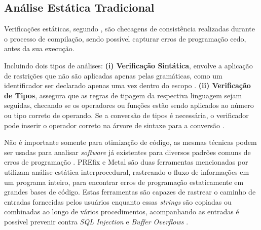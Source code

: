 \documentclass[
    12pt,                %
    openright,           %
    oneside,             %
    a4paper,             %
    english,             %
    brazil               %
]{abntex2}
\begin{document}
\begin{itemize}
\subsection{Análise Estática Tradicional}
\label{sec:analisetradicional}
\par
Verificações estáticas, segundo , são checagens de consistência realizadas durante o processo de compilação, sendo possível capturar erros de programação cedo, antes da sua execução. 
\par
Incluindo dois tipos de análises: 
\textbf{(i) Verificação Sintática}, envolve a aplicação de restrições que não são aplicadas apenas pelas gramáticas, como um identificador ser declarado apenas uma vez dentro do escopo \cite{aho2007compilers}.
\textbf{(ii) Verificação de Tipos}, assegura que as regras de tipagem da respectiva linguagem sejam seguidas, checando se os operadores ou funções estão sendo aplicados ao número ou tipo correto de operando.
Se a conversão de tipos é necessária, o verificador pode inserir o operador correto na árvore de sintaxe para a conversão \cite{aho2007compilers}.
\par
Não é importante somente para otimização de código, as mesmas técnicas podem ser usadas para analisar \textit{software} já existentes para diversos padrões comuns de erros de programação \cite{aho2007compilers}.
PREfix e Metal são duas ferramentas mencionadas por  utilizam análise estática interprocedural, rastreando o fluxo de informações em um programa inteiro, para encontrar erros de programação estaticamente em grandes bases de código.
Estas ferramentas são capazes de rastrear o caminho de entradas fornecidas pelos usuários enquanto essas \textit{strings} são copiadas ou combinadas ao longo de vários procedimentos, acompanhando as entradas é possível prevenir contra \textit{SQL Injection} e \textit{Buffer Overflows} \cite{aho2007compilers}.


\end{itemize}
\end{document}
